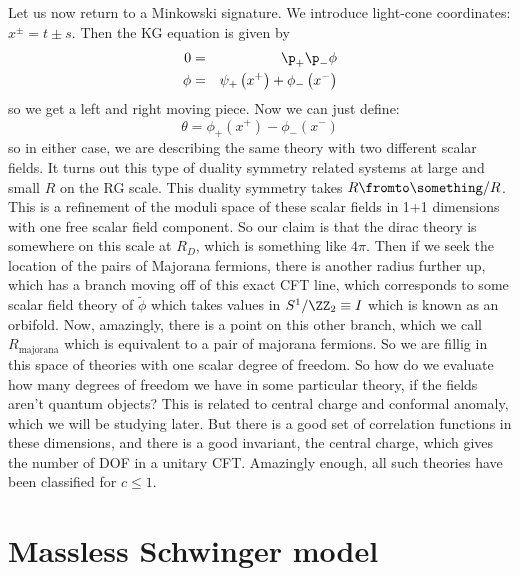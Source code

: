 \documentclass{booc}
\begin{document}
Let us now return to a Minkowski signature. 
We introduce light-cone coordinates: $x^{\pm} = t \pm s$.
Then the KG equation is given by
\begin{eqnarray}
0&=& \p_+ \p_- \phi 
\\
\phi &=&  \psi_+\left( x^+ \right) + \phi_-\left( x^- \right)
\end{eqnarray}
so we get a left and right moving piece. 
Now we can just define:
\begin{equation}
\theta = \phi_+\left( x^+ \right) - \phi_-\left( x^- \right)
\end{equation}
so in either case, we are describing the same theory with two different scalar fields. 
It turns out this type of duality symmetry related systems at large and small $R$ 
on the RG scale.
This duality symmetry takes $R\fromto \something /R$.
This is a refinement of the moduli space of these scalar fields in 1+1 dimensions with
one free scalar field component.
So our claim is that the dirac theory is somewhere on this scale at $R_D$, 
which is something like $4\pi$. 
Then if we seek the location of the pairs of Majorana fermions,
there is another radius further up, which has a branch moving off of this exact CFT line, which
corresponds to some scalar field theory of $\tilde \phi$
which takes values in $S^1 / \ZZ_2\equiv I$
which is known as an orbifold. 
Now, amazingly, there is a point on this other branch, which we call $R_{\text{majorana}}$
which is equivalent to a pair of majorana fermions. 
So we are fillig in this space of theories with one scalar degree of freedom.
So how do we evaluate how many degrees of freedom we have in some particular theory,
if the fields aren't quantum objects?
This is related to central charge and conformal anomaly, which we will be studying later. 
But there is a good set of correlation functions in these dimensions, 
and there is a good invariant, the central charge, which gives the number of DOF in a unitary CFT. 
Amazingly enough, all such theories have been classified for $c\leq 1$.





\section{Massless Schwinger model}
\end{document}
